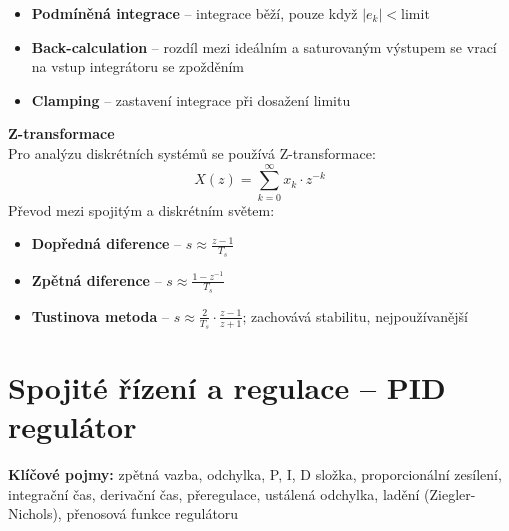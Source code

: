 \documentclass[a4paper,10pt]{article}
\begin{document}
\begin{vysvetlenibox}
\begin{itemize}[noitemsep, leftmargin=1.4em, topsep=4pt]
    \item \textbf{Podmíněná integrace} -- integrace běží, pouze když $|e_k| < \text{limit}$
    \item \textbf{Back-calculation} -- rozdíl mezi ideálním a saturovaným výstupem
          se vrací na vstup integrátoru se zpožděním
    \item \textbf{Clamping} -- zastavení integrace při dosažení limitu
\end{itemize}

\textbf{Z-transformace}\\
Pro analýzu diskrétních systémů se používá Z-transformace:
$$X(z) = \sum_{k=0}^{\infty} x_k \cdot z^{-k}$$
Převod mezi spojitým a diskrétním světem:
\begin{itemize}[noitemsep, leftmargin=1.4em, topsep=4pt]
    \item \textbf{Dopředná diference} -- $s \approx \frac{z-1}{T_s}$
    \item \textbf{Zpětná diference} -- $s \approx \frac{1-z^{-1}}{T_s}$
    \item \textbf{Tustinova metoda} -- $s \approx \frac{2}{T_s} \cdot \frac{z-1}{z+1}$;
          zachovává stabilitu, nejpoužívanější
\end{itemize}
\end{vysvetlenibox}

\section{Spojité řízení a regulace -- PID regulátor}

\begin{pojmybox}
\textbf{Klíčové pojmy:}
zpětná vazba, odchylka, P, I, D složka, proporcionální zesílení,
integrační čas, derivační čas, přeregulace, ustálená odchylka,
ladění (Ziegler-Nichols), přenosová funkce regulátoru
\end{pojmybox}
\end{document}
